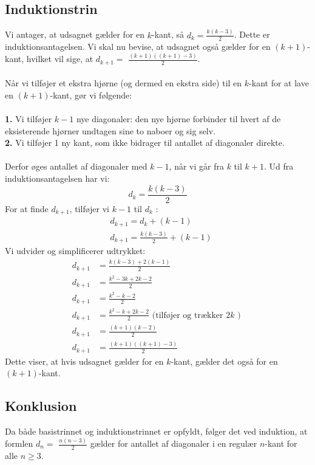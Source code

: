 \documentclass{article}
\begin{document}
\subsection{Induktionstrin}
Vi antager, at udsagnet gælder for en $k$-kant, så $d_k=\frac{k(k-3)}{2}$. Dette er induktionsantagelsen. Vi skal nu bevise, at udsagnet også gælder for en $(k+1)$-kant, hvilket vil sige, at $d_{k+1}=$ $\frac{(k+1)((k+1)-3)}{2}$.
\\
\\
Når vi tilføjer et ekstra hjørne (og dermed en ekstra side) til en $k$-kant for at lave en $(k+1)$-kant, gør vi følgende:
\\
\\
\textbf{1.} Vi tilføjer $k-1$ nye diagonaler: den nye hjørne forbinder til hvert af de eksisterende hjørner undtagen sine to naboer og sig selv.
\\
\textbf{2.} Vi tilføjer 1 ny kant, som ikke bidrager til antallet af diagonaler direkte.
\\
\\
Derfor øges antallet af diagonaler med $k-1$, når vi går fra $k$ til $k+1$. Ud fra induktionsantagelsen har vi:
$$
d_k=\frac{k(k-3)}{2}
$$
For at finde $d_{k+1}$, tilføjer vi $k-1$ til $d_k$ :
$$
\begin{aligned}
& d_{k+1}=d_k+(k-1) \\
& d_{k+1}=\frac{k(k-3)}{2}+(k-1)
\end{aligned}
$$
Vi udvider og simplificerer udtrykket:
$$
\begin{aligned}
d_{k+1} & =\frac{k(k-3)+2(k-1)}{2} \\
d_{k+1} & =\frac{k^2-3 k+2 k-2}{2} \\
d_{k+1} & =\frac{k^2-k-2}{2} \\
d_{k+1} & =\frac{k^2-k+2 k-2}{2} \text { (tilføjer og trækker } 2 k \text { ) } \\
d_{k+1} & =\frac{(k+1)(k-2)}{2} \\
d_{k+1} & =\frac{(k+1)((k+1)-3)}{2}
\end{aligned}
$$
Dette viser, at hvis udsagnet gælder for en $k$-kant, gælder det også for en $(k+1)$-kant.

\subsection{Konklusion}
Da både basistrinnet og induktionstrinnet er opfyldt, følger det ved induktion, at formlen $d_n=$ $\frac{n(n-3)}{2}$ gælder for antallet af diagonaler i en regulær $n$-kant for alle $n \geq 3$.
\end{document}

